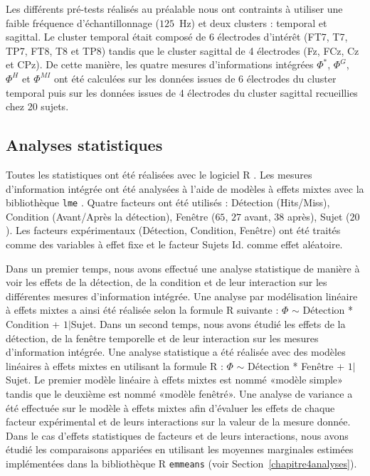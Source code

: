 Les différents pré-tests réalisés au préalable nous ont contraints à utiliser une faible fréquence d'échantillonnage ($125$~Hz) et deux clusters : temporal et sagittal. 
Le cluster temporal était composé de 6 électrodes d'intérêt (FT7, T7, TP7, FT8, T8 et TP8) tandis que le cluster sagittal de 4 électrodes (Fz, FCz, Cz et CPz). 
De cette manière, les quatre mesures d'informations intégrées $\Phi^*$, $\Phi^G$, $\Phi^H$ et $\Phi^{MI}$ ont été calculées sur les données issues de 6 électrodes du cluster temporal puis sur les données issues de 4 électrodes du cluster sagittal recueillies chez 20 sujets. 

\subsection{Analyses statistiques}
\label{analysesstattii}

Toutes les statistiques ont été réalisées avec le logiciel R \citep{Rlanguage2021}. 
Les mesures d'information intégrée ont été analysées à l'aide de modèles à effets mixtes avec la bibliothèque \texttt{lme} \citep{bates2007lme4}. 
Quatre facteurs ont été utilisés : Détection (Hits/Miss), Condition (Avant/Après la détection), Fenêtre ($65$, $27$ avant, $38$ après), Sujet ($20$). 
Les facteurs expérimentaux (Détection, Condition, Fenêtre) ont été traités comme des variables à effet fixe et le facteur Sujets Id. comme effet aléatoire. 

Dans un premier temps, nous avons effectué une analyse statistique de manière à voir les effets de la détection, de la condition et de leur interaction sur les différentes mesures d'information intégrée. 
Une analyse par modélisation linéaire à effets mixtes a ainsi été réalisée selon la formule R suivante : $\Phi$ $\sim$ Détection * Condition + $1|$Sujet. 
Dans un second temps, nous avons étudié les effets de la détection, de la fenêtre temporelle et de leur interaction sur les mesures d'information intégrée. 
Une analyse statistique a été réalisée avec des modèles linéaires à effets mixtes en utilisant la formule R : $\Phi$ $\sim$ Détection * Fenêtre + $1|$Sujet. 
Le premier modèle linéaire à effets mixtes est nommé «modèle simple» tandis que le deuxième est nommé «modèle fenêtré». 
Une analyse de variance a été effectuée sur le modèle à effets mixtes afin d'évaluer les effets de chaque facteur expérimental et de leurs interactions sur la valeur de la mesure donnée. 
Dans le cas d'effets statistiques de facteurs et de leurs interactions, nous avons étudié les comparaisons appariées en utilisant les moyennes marginales estimées implémentées dans la bibliothèque R \texttt{emmeans} (voir Section~\ref{chapitre4analyses}).

